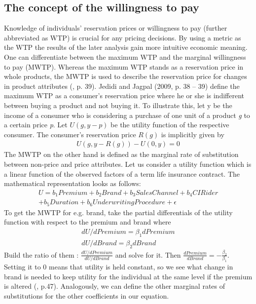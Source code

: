 \documentclass[12pt, abstracton]{article}
\begin{document}
\subsection{The concept of the willingness to pay}
Knowledge of individuals’ reservation prices or willingness to pay (further abbreviated as WTP) is crucial for any pricing decisions. By using a metric as the WTP the results of the later analysis gain more intuitive economic meaning. One can differentiate between the maximum WTP and the marginal willingness to pay (MWTP). Whereas the maximum WTP stands as a reservation price in whole products, the MWTP is used to describe the reservation price for changes in product attributes (\cite{Jedidi2009}, p. 39). Jedidi and Jagpal (2009, p. 38 – 39) define the maximum WTP as a consumer’s reservation price where he or she is indifferent between buying a product and not buying it. To illustrate this, let y be the income of a consumer who is considering a purchase of one unit of a product \textit{g} to a certain price \textit{p}. Let $U(g, y-p)$ be the utility function of the respective consumer. The consumer’s reservation price $R(g)$ is implicitly given by
\begin{align}
U(g,y-R(g)) - U(0,y) = 0
\end{align}
The MWTP on the other hand is defined as the marginal rate of substitution between non-price and price attributes.  Let us consider a utility function which is a linear function of the observed factors of a term life insurance contract. The mathematical representation looks as follows:
\begin{equation}
\begin{split}
U = b_{1} Premium + b_{2} Brand + b_{3} SalesChannel + b_{4} CIRider\\ + b_{5}Duration + b_{6} UnderwritingProcedure + \epsilon
\end{split}
\end{equation}
To get the MWTP for e.g. brand, take the partial differentials of the utility function with respect to the premium and brand where  
\begin{align}
dU/dPremium = \beta_{1}dPremium\\
dU/dBrand =  \beta_{2}dBrand
\end{align}
Build the ratio of them :
$\frac{dU/dPremium}{dU/dBrand}$
and solve for it. Then $\frac{dPremium}{dBrand} = -\frac{\beta_{2}}{\beta_{1}}$. Setting it to 0 means that utility is held constant, so we see what change in  brand is needed to keep utility for the individual at the same level if the premium is altered (\cite{Train2003}, p.47). Analogously, we can define the other marginal rates of substitutions for the other coefficients in our equation.\\
\end{document}
